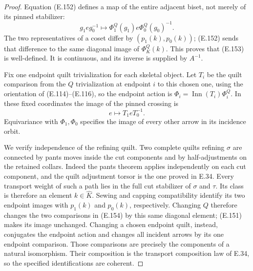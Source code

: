 \begin{proof}
Equation (E.152) defines a map of the entire adjacent biset,
not merely of its pinned stabilizer:
\[
  g_1 e g_0^{-1}\longmapsto
                  \Phi_1^Q(g_1)e\Phi_0^Q(g_0)^{-1}.          \tag{E.153}
\]
The two representatives of a coset differ by $(p_1(k),p_0(k))$;
(E.152) sends that difference to the same diagonal image of
$\Phi_K^Q(k)$.  This proves that (E.153) is well-defined.
It is continuous, and its inverse is supplied by $A^{-1}$.

Fix one endpoint quilt trivialization for each skeletal object.
Let $T_i$ be the quilt comparison from the $Q$ trivialization at
endpoint $i$ to this chosen one, using the orientation of
(E.114)--(E.116), so the endpoint action is
$\Phi_i=\operatorname{Inn}(T_i)\Phi_i^Q$.
In these fixed coordinates the image of the pinned crossing is
\[
                e\longmapsto T_1 e T_0^{-1}.                 \tag{E.154}
\]
Equivariance with $\Phi_1,\Phi_0$ specifies the image of every
other arrow in its incidence orbit.

We verify independence of the refining quilt.  Two complete
quilts refining $\sigma$ are connected by pants moves inside
the cut components and by half-adjustments on the retained
collars.  Indeed the pants theorem applies independently on
each cut component, and the quilt adjustment torsor is the one
proved in E.34.  Every transport weight of such a path lies in
the full cut stabilizer of $\sigma$ and $\tau$.  Its class is
therefore an element $k\in\widehat K$.  Sewing and capping
compatibility identify its two endpoint images with $p_1(k)$
and $p_0(k)$, respectively.  Changing $Q$ therefore changes the
two comparisons in (E.154) by this same diagonal element;
(E.151) makes its image unchanged.  Changing a chosen endpoint
quilt, instead, conjugates the endpoint action and changes all
incident arrows by its one endpoint comparison.  Those
comparisons are precisely the components of a natural
isomorphism.  Their composition is the transport composition
law of E.34, so the specified identifications are coherent.


\end{proof}
